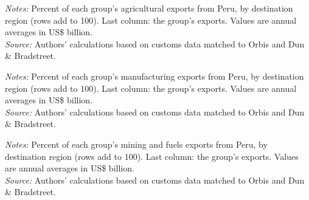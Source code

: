 \documentclass[11pt,a4paper]{article}
\begin{document}
\begin{table}[H]\centering\small%
  \caption{Peru, Agriculture: Multinational Exports by Parent Region and Destination Region}%
  \label{tab:c_reg_PER_agro}%
  \par\vspace{3pt}%
  \begin{minipage}{0.95\textwidth}\footnotesize %
  \textit{Notes:} Percent of each group's agricultural exports from Peru, by destination region (rows add to 100). Last column: the group's exports. Values are annual averages in US\$ billion.\\[3pt]%
  \textit{Source:} Authors' calculations based on customs data matched to Orbis and Dun \& Bradstreet.%
  \end{minipage}%
  \end{table}
\begin{table}[H]\centering\small%
  \caption{Peru, Manufacturing: Multinational Exports by Parent Region and Destination Region}%
  \label{tab:c_reg_PER_manufacturing}%
  \par\vspace{3pt}%
  \begin{minipage}{0.95\textwidth}\footnotesize %
  \textit{Notes:} Percent of each group's manufacturing exports from Peru, by destination region (rows add to 100). Last column: the group's exports. Values are annual averages in US\$ billion.\\[3pt]%
  \textit{Source:} Authors' calculations based on customs data matched to Orbis and Dun \& Bradstreet.%
  \end{minipage}%
  \end{table}
\begin{table}[H]\centering\small%
  \caption{Peru, Mining and Fuels: Multinational Exports by Parent Region and Destination Region}%
  \label{tab:c_reg_PER_mining}%
  \par\vspace{3pt}%
  \begin{minipage}{0.95\textwidth}\footnotesize %
  \textit{Notes:} Percent of each group's mining and fuels exports from Peru, by destination region (rows add to 100). Last column: the group's exports. Values are annual averages in US\$ billion.\\[3pt]%
  \textit{Source:} Authors' calculations based on customs data matched to Orbis and Dun \& Bradstreet.%
  \end{minipage}%
  \end{table}
\end{document}
